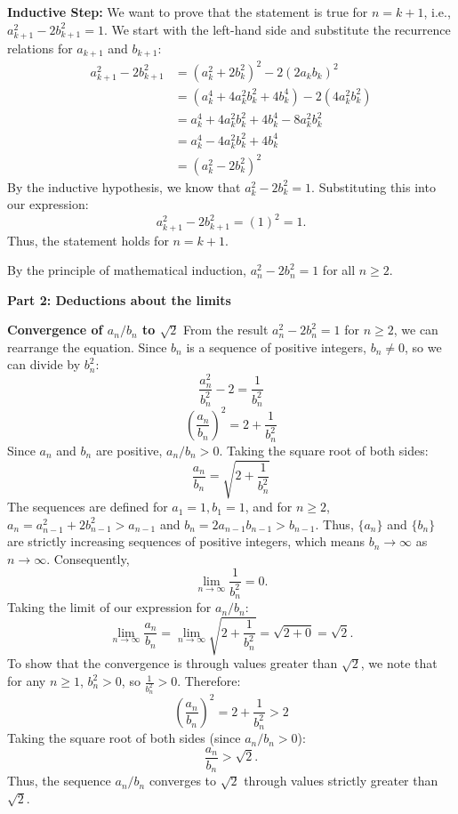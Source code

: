 \textbf{Inductive Step:}
We want to prove that the statement is true for $n=k+1$, i.e., $a_{k+1}^2 - 2b_{k+1}^2 = 1$.
We start with the left-hand side and substitute the recurrence relations for $a_{k+1}$ and $b_{k+1}$:
\begin{align*}
a_{k+1}^2 - 2b_{k+1}^2 &= (a_k^2 + 2b_k^2)^2 - 2(2a_k b_k)^2 \\
&= (a_k^4 + 4a_k^2 b_k^2 + 4b_k^4) - 2(4a_k^2 b_k^2) \\
&= a_k^4 + 4a_k^2 b_k^2 + 4b_k^4 - 8a_k^2 b_k^2 \\
&= a_k^4 - 4a_k^2 b_k^2 + 4b_k^4 \\
&= (a_k^2 - 2b_k^2)^2
\end{align*}
By the inductive hypothesis, we know that $a_k^2 - 2b_k^2 = 1$. Substituting this into our expression:
\[ a_{k+1}^2 - 2b_{k+1}^2 = (1)^2 = 1. \]
Thus, the statement holds for $n=k+1$.

By the principle of mathematical induction, $a_n^2 - 2b_n^2 = 1$ for all $n \geq 2$.

\textbf{Part 2: Deductions about the limits}

\textbf{Convergence of $a_n/b_n$ to $\sqrt{2}$}
From the result $a_n^2 - 2b_n^2 = 1$ for $n \geq 2$, we can rearrange the equation. Since $b_n$ is a sequence of positive integers, $b_n \neq 0$, so we can divide by $b_n^2$:
\[ \frac{a_n^2}{b_n^2} - 2 = \frac{1}{b_n^2} \]
\[ \left(\frac{a_n}{b_n}\right)^2 = 2 + \frac{1}{b_n^2} \]
Since $a_n$ and $b_n$ are positive, $a_n/b_n > 0$. Taking the square root of both sides:
\[ \frac{a_n}{b_n} = \sqrt{2 + \frac{1}{b_n^2}} \]
The sequences are defined for $a_1=1, b_1=1$, and for $n \geq 2$, $a_n = a_{n-1}^2+2b_{n-1}^2 > a_{n-1}$ and $b_n = 2a_{n-1}b_{n-1} > b_{n-1}$. Thus, $\{a_n\}$ and $\{b_n\}$ are strictly increasing sequences of positive integers, which means $b_n \to \infty$ as $n \to \infty$.
Consequently,
\[ \lim_{n \to \infty} \frac{1}{b_n^2} = 0. \]
Taking the limit of our expression for $a_n/b_n$:
\[ \lim_{n \to \infty} \frac{a_n}{b_n} = \lim_{n \to \infty} \sqrt{2 + \frac{1}{b_n^2}} = \sqrt{2+0} = \sqrt{2}. \]
To show that the convergence is through values greater than $\sqrt{2}$, we note that for any $n \geq 1$, $b_n^2 > 0$, so $\frac{1}{b_n^2} > 0$. Therefore:
\[ \left(\frac{a_n}{b_n}\right)^2 = 2 + \frac{1}{b_n^2} > 2 \]
Taking the square root of both sides (since $a_n/b_n > 0$):
\[ \frac{a_n}{b_n} > \sqrt{2}. \]
Thus, the sequence $a_n/b_n$ converges to $\sqrt{2}$ through values strictly greater than $\sqrt{2}$.

